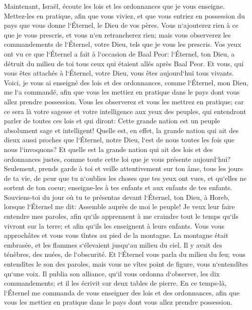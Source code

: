 \verse Maintenant, Israël, écoute les lois et les ordonnances que je vous enseigne. Mettez-les en pratique, afin que vous viviez, et que vous entriez en possession du pays que vous donne l`Éternel, le Dieu de vos pères. 
\verse Vous n`ajouterez rien à ce que je vous prescris, et vous n`en retrancherez rien; mais vous observerez les commandements de l`Éternel, votre Dieu, tels que je vous les prescris. 
\verse Vos yeux ont vu ce que l`Éternel a fait à l`occasion de Baal Peor: l`Éternel, ton Dieu, a détruit du milieu de toi tous ceux qui étaient allés après Baal Peor. 
\verse Et vous, qui vous êtes attachés à l`Éternel, votre Dieu, vous êtes aujourd`hui tous vivants. 
\verse Voici, je vous ai enseigné des lois et des ordonnances, comme l`Éternel, mon Dieu, me l`a commandé, afin que vous les mettiez en pratique dans le pays dont vous allez prendre possession. 
\verse Vous les observerez et vous les mettrez en pratique; car ce sera là votre sagesse et votre intelligence aux yeux des peuples, qui entendront parler de toutes ces lois et qui diront: Cette grande nation est un peuple absolument sage et intelligent! 
\verse Quelle est, en effet, la grande nation qui ait des dieux aussi proches que l`Éternel, notre Dieu, l`est de nous toutes les fois que nous l`invoquons? 
\verse Et quelle est la grande nation qui ait des lois et des ordonnances justes, comme toute cette loi que je vous présente aujourd`hui? 
\verse Seulement, prends garde à toi et veille attentivement sur ton âme, tous les jours de ta vie, de peur que tu n`oublies les choses que tes yeux ont vues, et qu`elles ne sortent de ton coeur; enseigne-les à tes enfants et aux enfants de tes enfants. 
\verse Souviens-toi du jour où tu te présentas devant l`Éternel, ton Dieu, à Horeb, lorsque l`Éternel me dit: Assemble auprès de moi le peuple! Je veux leur faire entendre mes paroles, afin qu`ils apprennent à me craindre tout le temps qu`ils vivront sur la terre; et afin qu`ils les enseignent à leurs enfants. 
\verse Vous vous approchâtes et vous vous tîntes au pied de la montagne. La montagne était embrasée, et les flammes s`élevaient jusqu`au milieu du ciel. Il y avait des ténèbres, des nuées, de l`obscurité. 
\verse Et l`Éternel vous parla du milieu du feu; vous entendîtes le son des paroles, mais vous ne vîtes point de figure, vous n`entendîtes qu`une voix. 
\verse Il publia son alliance, qu`il vous ordonna d`observer, les dix commandements; et il les écrivit sur deux tables de pierre. 
\verse En ce temps-là, l`Éternel me commanda de vous enseigner des lois et des ordonnances, afin que vous les mettiez en pratique dans le pays dont vous allez prendre possession. 
